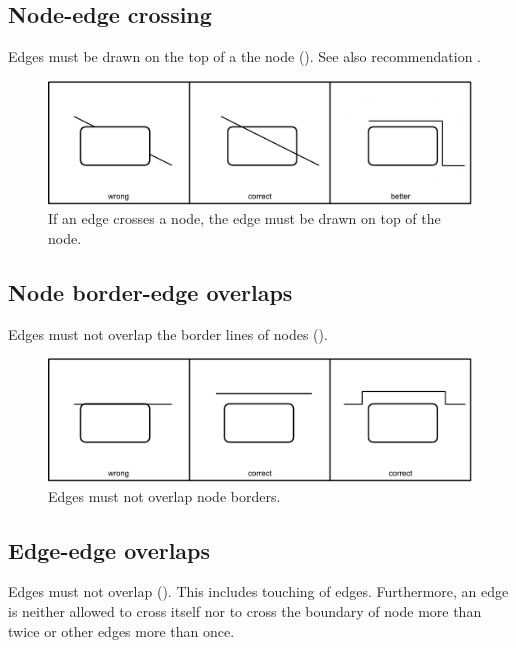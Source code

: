 \subsection{Node-edge crossing}\label{crosEdNoRe}

Edges must be drawn on the top of a the node (). See also recommendation .

\begin{figure}[htb]
  \centering
  \includegraphics[scale=0.8]{images/build/layout_node_edge.pdf}
  \caption{If an edge crosses a node, the edge must be drawn on top
  of the node.}\label{fig:layout2}
\end{figure}

\subsection{Node border-edge overlaps}

Edges must not overlap the border lines of nodes ().

\begin{figure}[htb]
  \centering
  \includegraphics[scale=0.8]{images/build/layout_node_border_edge.pdf}
  \caption{Edges must not overlap node borders.}\label{fig:layout3}
\end{figure}

\subsection{Edge-edge overlaps}

Edges must not overlap (). This includes touching of edges.
Furthermore, an edge is neither allowed to cross itself nor to cross
the boundary of node more than twice or other edges more than once.

